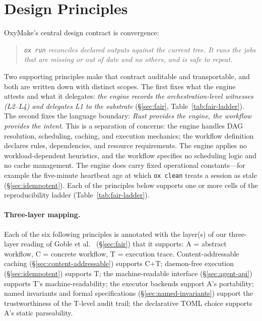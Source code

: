 \documentclass[12pt,a4paper]{article}
\newcommand{\code}[1]{{\texttt{\small\color{inlinecode}#1}}}
\begin{document}
\section{Design Principles}
\label{sec:design}

OxyMake's central design contract is convergence:

\begin{quote}
\emph{\code{ox run} reconciles declared outputs against the current
tree. It runs the jobs that are missing or out of date and no others,
and is safe to repeat.}
\end{quote}

\noindent Two supporting principles make that contract auditable and
transportable, and both are written down with distinct scopes.
The first fixes what the engine attests and what it delegates: \emph{the
engine records the orchestration-level witnesses (L2--L4) and delegates
L1 to the substrate} (\S\ref{sec:fair}, Table~\ref{tab:fair-ladder}). The second fixes
the language boundary: \emph{Rust provides the engine, the workflow
provides the intent}. This is a separation of concerns: the engine
handles DAG resolution, scheduling, caching, and execution mechanics; the
workflow definition declares rules, dependencies, and resource requirements.
The engine applies no workload-dependent heuristics, and the
workflow specifies no scheduling logic and no cache management. The
engine does carry fixed operational constants---for example the
five-minute heartbeat age at which \code{ox clean} treats a session as
stale (\S\ref{sec:idempotent}). Each of
the principles below supports one or more cells of the reproducibility
ladder (Table~\ref{tab:fair-ladder}).

\paragraph{Three-layer mapping.}
Each of the six following principles is annotated with the layer(s) of
our three-layer reading of Goble et
al.~\cite{gobleFAIRComputationalWorkflows2020} (\S\ref{sec:fair}) that
it supports:
A = abstract workflow, C = concrete workflow, T = execution trace.
Content-addressable caching (\S\ref{sec:content-addressable})
supports C+T; daemon-free execution
(\S\ref{sec:idempotent}) supports T;
the machine-readable interface (\S\ref{sec:agent-api}) supports T's
machine-readability; the executor backends support A's portability;
named invariants and formal specifications
(\S\ref{sec:named-invariants}) support the trustworthiness of the
T-level audit trail; the declarative TOML
choice supports A's static parseability.
\end{document}
